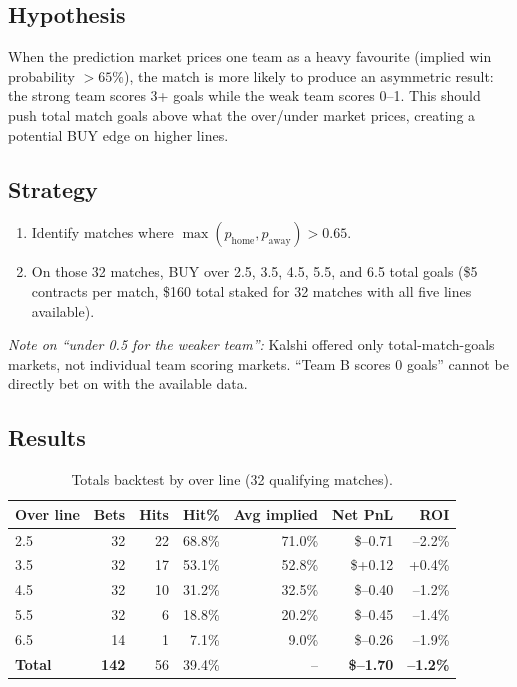\documentclass[11pt, a4paper]{article}
\begin{document}
\subsection{Hypothesis}

When the prediction market prices one team as a heavy favourite
(implied win probability $> 65\%$), the match is more likely to produce
an asymmetric result: the strong team scores 3+ goals while the weak team
scores 0--1.  This should push total match goals above what the
over/under market prices, creating a potential BUY edge on higher lines.

\subsection{Strategy}

\begin{enumerate}
  \item Identify matches where $\max(p_{\text{home}}, p_{\text{away}}) > 0.65$.
  \item On those 32 matches, BUY over 2.5, 3.5, 4.5, 5.5, and 6.5 total
        goals (\$5 contracts per match, \$160 total staked for 32 matches with
        all five lines available).
\end{enumerate}

\noindent\textit{Note on ``under 0.5 for the weaker team'':} Kalshi offered
only total-match-goals markets, not individual team scoring markets.
``Team B scores 0 goals'' cannot be directly bet on with the available data.

\subsection{Results}

\begin{table}[h!]
\centering
\caption{Totals backtest by over line (32 qualifying matches).}
\begin{tabular}{lrrrrrr}
\toprule
Over line & Bets & Hits & Hit\% & Avg implied & Net PnL & ROI \\
\midrule
2.5 & 32 & 22 & 68.8\% & 71.0\% & \$--0.71 & --2.2\% \\
3.5 & 32 & 17 & 53.1\% & 52.8\% & \$+0.12  & +0.4\% \\
4.5 & 32 & 10 & 31.2\% & 32.5\% & \$--0.40 & --1.2\% \\
5.5 & 32 &  6 & 18.8\% & 20.2\% & \$--0.45 & --1.4\% \\
6.5 & 14 &  1 &  7.1\% &  9.0\% & \$--0.26 & --1.9\% \\
\midrule
\textbf{Total} & \textbf{142} & 56 & 39.4\% & -- & \textbf{\$--1.70} & \textbf{--1.2\%} \\
\bottomrule
\end{tabular}
\end{table}
\end{document}
